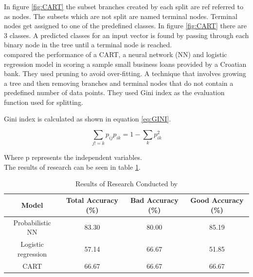 In figure \ref{fig:CART} the subset branches created by each split are ref referred to as nodes. The subsets which are not split are named terminal nodes. Terminal nodes get assigned to one of the predefined classes. In figure \ref{fig:CART} there are 3 classes. A predicted classes for an input vector is found by passing through each binary node in the tree until a terminal node is reached. \\

\textcite{DecTreesZekic} compared the performance of a CART, a neural network (NN) and logistic regression model in scoring a sample small business loans provided by a Croatian bank. They used pruning to avoid over-fitting. A technique that involves growing a tree and then removing branches and terminal nodes that do not contain a predefined number of data points. They used Gini index as the evaluation function used for splitting. \newpage


Gini index is calculated as shown in equation \ref{eq:GINI}. 

\vspace{15pt}

\begin{equation} \label{eq:GINI}
\sum_{j!=k}p_{ij}p_{ik} = 1 - \sum_{k}p_{ik}^{2}
\end{equation}
\vspace{15pt}

Where p represents the independent variables. \\


The results of \textcite{DecTreesZekic} research can be seen in table \ref{table:CART}. \\


\begin{table}[H]
\begin{center}
\begin{tabular}{|c|c|c|c|} 
\hline
\multicolumn{1}{|c}{Model}  &\multicolumn{1}{|c|}{Total Accuracy (\%)}  &\multicolumn{1}{|c|}{Bad Accuracy (\%)} & \multicolumn{1}{c|}{Good Accuracy (\%)}\\
\hline
Probabilistic NN & 83.30 &  80.00 & 85.19 \\
\hline
Logistic regression & 57.14 &  66.67 & 51.85 \\
\hline
CART & 66.67 &  66.67 & 66.67 \\
\hline
\end{tabular}
\end{center}
\caption{Results of Research Conducted by \textcite{DecTreesZekic} }
\label{table:CART}
\end{table}


